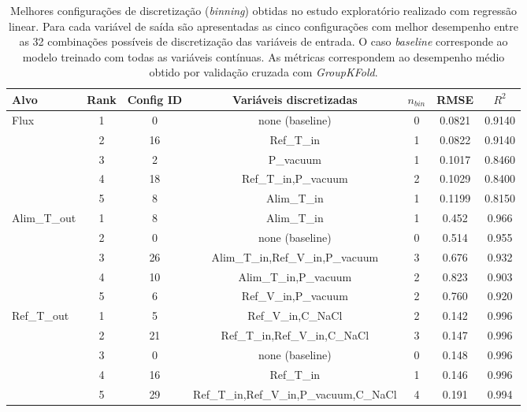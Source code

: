 \begin{table}[H]
\centering
\small
\setlength{\tabcolsep}{5pt}
\caption{Melhores configurações de discretização (\textit{binning}) obtidas no estudo exploratório realizado com regressão linear. Para cada variável de saída são apresentadas as cinco configurações com melhor desempenho entre as 32 combinações possíveis de discretização das variáveis de entrada. O caso \textit{baseline} corresponde ao modelo treinado com todas as variáveis contínuas. As métricas correspondem ao desempenho médio obtido por validação cruzada com \textit{GroupKFold}.}
\label{tab:binning_resultados_apendice}
\begin{tabular}{lcccccc}
\toprule
\textbf{Alvo} & \textbf{Rank} & \textbf{Config ID} & \textbf{Variáveis discretizadas} & \textbf{$n_{bin}$} & \textbf{RMSE} & \textbf{$R^2$} \\
\midrule

\multirow{5}{*}{Flux}
 & 1 & 0  & none (baseline) & 0 & 0.0821 & 0.9140 \\
 & 2 & 16 & Ref\_T\_in & 1 & 0.0822 & 0.9140 \\
 & 3 & 2  & P\_vacuum & 1 & 0.1017 & 0.8460 \\
 & 4 & 18 & Ref\_T\_in,P\_vacuum & 2 & 0.1029 & 0.8400 \\
 & 5 & 8  & Alim\_T\_in & 1 & 0.1199 & 0.8150 \\

\midrule

\multirow{5}{*}{Alim\_T\_out}
 & 1 & 8  & Alim\_T\_in & 1 & 0.452 & 0.966 \\
 & 2 & 0  & none (baseline) & 0 & 0.514 & 0.955 \\
 & 3 & 26 & Alim\_T\_in,Ref\_V\_in,P\_vacuum & 3 & 0.676 & 0.932 \\
 & 4 & 10 & Alim\_T\_in,P\_vacuum & 2 & 0.823 & 0.903 \\
 & 5 & 6  & Ref\_V\_in,P\_vacuum & 2 & 0.760 & 0.920 \\

\midrule

\multirow{5}{*}{Ref\_T\_out}
 & 1 & 5  & Ref\_V\_in,C\_NaCl & 2 & 0.142 & 0.996 \\
 & 2 & 21 & Ref\_T\_in,Ref\_V\_in,C\_NaCl & 3 & 0.147 & 0.996 \\
 & 3 & 0  & none (baseline) & 0 & 0.148 & 0.996 \\
 & 4 & 16 & Ref\_T\_in & 1 & 0.146 & 0.996 \\
 & 5 & 29 & Ref\_T\_in,Ref\_V\_in,P\_vacuum,C\_NaCl & 4 & 0.191 & 0.994 \\

\bottomrule
\end{tabular}
\end{table}

